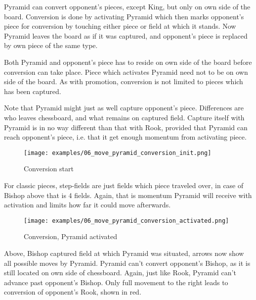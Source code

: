 Pyramid can convert opponent's pieces, except King, but only on own side of
the board. Conversion is done by activating Pyramid which then marks opponent's
piece for conversion by touching either piece or field at which it stands. Now
Pyramid leaves the board as if it was captured, and opponent's piece is replaced
by own piece of the same type.

Both Pyramid and opponent's piece has to reside on own side of the board
before conversion can take place. Piece which activates Pyramid need not
to be on own side of the board. As with promotion, conversion is not limited
to pieces which has been captured.

Note that Pyramid might just as well capture opponent's piece. Differences are
who leaves chessboard, and what remains on captured field. Capture itself with
Pyramid is in no way different than that with Rook, provided that Pyramid can
reach opponent's piece, i.e. that it get enough momentum from activating piece.

\clearpage %

\noindent
\begin{figure}[!h]
\texttt{[image: examples/06\_move\_pyramid\_conversion\_init.png]}
\caption{Conversion start}
\label{fig:06_move_pyramid_conversion_init}
\end{figure}

For classic pieces, step-fields are just fields which piece traveled over,
in case of Bishop above that is 4 fields. Again, that is momentum Pyramid
will receive with activation and limits how far it could move afterwards.

\clearpage %

\noindent
\begin{figure}[!h]
\texttt{[image: examples/06\_move\_pyramid\_conversion\_activated.png]}
\caption{Conversion, Pyramid activated}
\label{fig:06_move_pyramid_conversion_activated}
\end{figure}

Above, Bishop captured field at which Pyramid was situated, arrows now show
all possible moves by Pyramid. Pyramid can't convert opponent's Bishop, as it
is still located on own side of chessboard. Again, just like Rook, Pyramid
can't advance past opponent's Bishop. Only full movement to the right leads
to conversion of opponent's Rook, shown in red.

